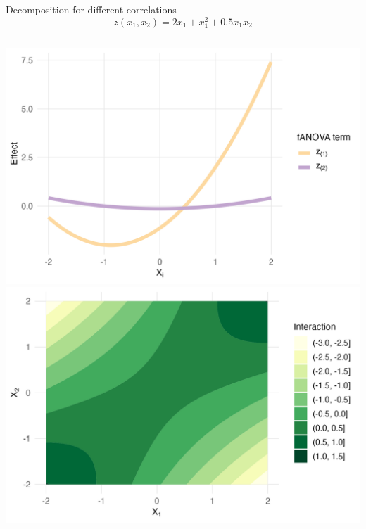 \begin{frame}{Decomposition for different correlations}
    \[
    z(x_1, x_2) = 2x_1 + x_1^2 + 0.5 x_1 x_2
    \]
  \begin{columns}
      \includegraphics[width=\linewidth]{../images/experiment_section/full_a1p20_a2p00_a11p10_a22p00_a12p05_rhop03_main.png}
      \includegraphics[width=\linewidth]{../images/experiment_section/full_a1p20_a2p00_a11p10_a22p00_a12p05_rhop03_interaction.png}
  \end{columns}
  
\end{frame}

